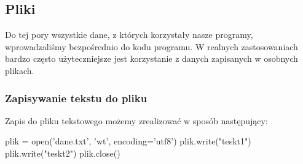 % 
% 
% 
% 

\subsection{Pliki}
Do tej pory wszystkie dane, z których korzystały nasze programy, wprowadzaliśmy bezpośrednio do kodu programu.
W realnych zastosowaniach bardzo często użyteczniejsze jest korzystanie z danych zapisanych w osobnych plikach.

\subsubsection{Zapisywanie tekstu do pliku}

Zapis do pliku tekstowego możemy zrealizować w sposób następujący:
\begin{CodeFrame*}[python]{}
plik = open('dane.txt', 'wt', encoding='utf8')
plik.write("teskt1\n")
plik.write("teskt2")
plik.close()
\end{CodeFrame*}


